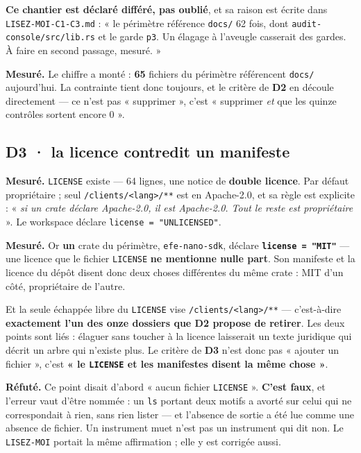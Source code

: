 \documentclass[11pt]{article}
\newcommand{\code}[1]{\texttt{\small #1}}
\newcommand{\best}[1]{{\color{efesolve}\textbf{#1}}}
\newcommand{\pire}[1]{{\color{efered}\textbf{#1}}}
\newcommand{\mm}[1]{\textbf{#1}}
\newcommand{\mesure}[1]{{\color{efeteal}\textbf{Mesuré.} }#1\par}
\newcommand{\refute}[1]{{\color{efered}\textbf{Réfuté.} }#1\par}
\begin{document}
\begin{cadre}
\textbf{Ce chantier est déclaré différé, pas oublié}, et sa raison est écrite dans
\code{LISEZ-MOI-C1-C3.md} : « le périmètre référence \code{docs/} 62 fois, dont
\code{audit-console/src/lib.rs} et le garde \code{p3}. Un élagage à l'aveugle casserait des
gardes. À faire en second passage, mesuré. »

\mesure{Le chiffre a monté : \best{65} fichiers du périmètre référencent \code{docs/} aujourd'hui.
La contrainte tient donc toujours, et le critère de \mm{D2} en découle directement --- ce n'est
pas « supprimer », c'est « supprimer \emph{et} que les quinze contrôles sortent encore 0 ».}
\end{cadre}

\subsection{\mm{D3} · la licence contredit un manifeste}
\mesure{\code{LICENSE} existe --- 64 lignes, une notice de \textbf{double licence}. Par défaut
propriétaire ; seul \code{/clients/<lang>/**} est en Apache-2.0, et sa règle est explicite :
« \emph{si un crate déclare Apache-2.0, il est Apache-2.0. Tout le reste est propriétaire} ». Le
workspace déclare \code{license = "UNLICENSED"}.}

\mesure{Or \best{un} crate du périmètre, \code{efe-nano-sdk}, déclare \pire{\code{license =
"MIT"}} --- une licence que le fichier \code{LICENSE} \textbf{ne mentionne nulle part}. Son
manifeste et la licence du dépôt disent donc deux choses différentes du même crate : MIT d'un
côté, propriétaire de l'autre.}

Et la seule échappée libre du \code{LICENSE} vise \code{/clients/<lang>/**} --- c'est-à-dire
\textbf{exactement l'un des onze dossiers que \mm{D2} propose de retirer}. Les deux points sont
liés : élaguer sans toucher à la licence laisserait un texte juridique qui décrit un arbre qui
n'existe plus. Le critère de \mm{D3} n'est donc pas « ajouter un fichier », c'est
\textbf{« le \code{LICENSE} et les manifestes disent la même chose »}.

\begin{cadre}
\refute{Ce point disait d'abord « aucun fichier \code{LICENSE} ». \textbf{C'est faux}, et l'erreur
vaut d'être nommée : un \code{ls} portant deux motifs a avorté sur celui qui ne correspondait à
rien, sans rien lister --- et l'absence de sortie a été lue comme une absence de fichier. Un
instrument muet n'est pas un instrument qui dit non. Le \code{LISEZ-MOI} portait la même
affirmation ; elle y est corrigée aussi.}
\end{cadre}
\end{document}
